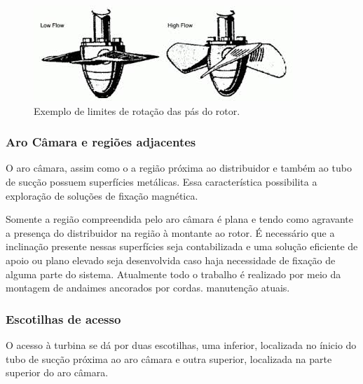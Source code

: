 \begin{figure}[h!]	
	\includegraphics[width=\columnwidth]{sota/figs/intro/blades_angle}
	\caption{Exemplo de limites de rotação das pás do rotor.}
	\label{fig::blades_angle}
\end{figure}

\subsubsection{Aro Câmara e regiões adjacentes}

O aro câmara, assim como o a região próxima ao distribuidor e também ao tubo de
sucção possuem superfícies metálicas. Essa característica possibilita a
exploração de soluções de fixação magnética.

Somente a região compreendida pelo aro câmara é plana e tendo como agravante a presença do distribuidor na região à 
montante ao rotor. É necessário que a inclinação presente nessas superfícies seja contabilizada e uma solução eficiente 
de apoio ou plano elevado seja desenvolvida caso haja necessidade de fixação de alguma parte do sistema. Atualmente todo 
o trabalho é realizado por meio da montagem de andaimes ancorados por cordas. %
manutenção atuais.


 
\subsubsection{Escotilhas de acesso}
O acesso à turbina se dá por duas escotilhas, uma inferior, localizada no ínicio do tubo de sucção 
próxima ao aro câmara e outra superior, localizada na parte superior do aro câmara.

